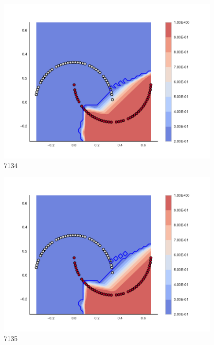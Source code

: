\begin{subfigure}[b]{0.09\textwidth}
    \includegraphics[clip, trim=2.35cm 1.75cm 4.5cm 0cm,width=\textwidth]{img/convergence/7134.pdf}
    \caption{7134}
    \label{fig:convergence_7134}
\end{subfigure}
%
\begin{subfigure}[b]{0.09\textwidth}
    \includegraphics[clip, trim=2.35cm 1.75cm 4.5cm 0cm,width=\textwidth]{img/convergence/7135.pdf}
    \caption{7135}
    \label{fig:convergence_7135}
\end{subfigure}
%
